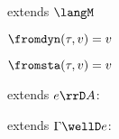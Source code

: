 {\flushleft
{} extends $\langM$

\medskip
$\fromdyn(\tau, v) = v$

\smallskip

$\fromsta(\tau, v) = v$

\medskip
{} extends $e \rrD A$:
\begin{mathpar}


\end{mathpar}

\medskip
{} extends $\Gamma \wellD e$:
\begin{mathpar}


\end{mathpar}

}
